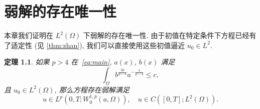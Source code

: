 \documentclass[twoside,longtitle]{LZUthesis}
\newtheorem{theorem}{定理}[chapter]
\theoremstyle{definition}
\numberwithin{equation}{chapter}
\begin{document}
\chapter{弱解的存在唯一性}\label{ch:Existence_and_uniqueness_of_the_weak_solution}
本章我们证明在 $L^2(\Omega)$ 下弱解的存在唯一性.
由于初值在特定条件下方程已经有了适定性 (见 \cref{thm:zhan}),
我们可以直接使用这些初值逼近 $u_0 \in L^2$.
\begin{theorem}\label{thm:absorb}
	如果 $p>4$ 在~\cref{eq:main}, $a(x)$, $b(x)$ 满足
	\begin{equation}
		\int_{\Omega} b^{\frac{2p}{p-4}}a^{-\frac{4}{p-4}} \leq c,
	\end{equation}
	且 $u_0 \in L^2(\Omega) $, 那么方程存在弱解满足
	\begin{equation}
		u \in L^p(0, T; W_0^{1,p}(a,\Omega)), \quad u \in C([0, T]; L^2(\Omega)).
	\end{equation}
\end{theorem}
\end{document}
